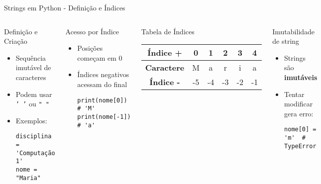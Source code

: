 \begin{frame}[fragile]{Strings em Python - Definição e Índices}

\begin{columns}[T]
    \begin{block}{Definição e Criação}
        \begin{itemize}
            \item Sequência imutável de caracteres
            \item Podem usar \texttt{' '} ou \texttt{" "}
            \item Exemplos:
\begin{verbatim}
disciplina = 'Computação 1'
nome = "Maria"
\end{verbatim}
        \end{itemize}
    \end{block}

    \begin{block}{Acesso por Índice}
        \begin{itemize}
            \item Posições começam em 0
            \item Índices negativos acessam do final
\begin{verbatim}
print(nome[0])   # 'M'
print(nome[-1])  # 'a'
\end{verbatim}
        \end{itemize}
    \end{block}

    \begin{exampleblock}{Tabela de Índices}
        \centering
        \begin{tabular}{|c|c|c|c|c|c|}
            \hline
            \textbf{Índice +} & 0 & 1 & 2 & 3 & 4 \\
            \hline
            \textbf{Caractere} & M & a & r & i & a \\
            \hline
            \textbf{Índice -} & -5 & -4 & -3 & -2 & -1 \\
            \hline
        \end{tabular}
    \end{exampleblock}

    \begin{block}{Imutabilidade de string}
        \begin{itemize}
            \item Strings são \textbf{imutáveis}
            \item Tentar modificar gera erro:
\begin{verbatim}
nome[0] = 'm'  # TypeError
\end{verbatim}
        \end{itemize}
    \end{block}
\end{columns}

\end{frame}


